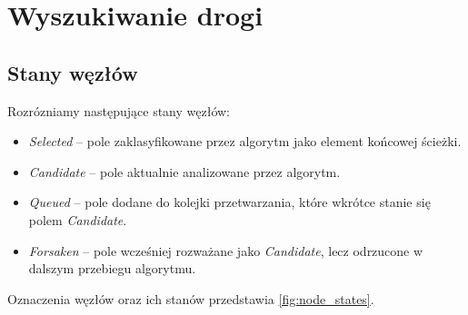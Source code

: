 \documentclass[../../doc.tex]{subfiles}
\begin{document}
\section{Wyszukiwanie drogi}


\subsection{Stany węzłów}

\label{sec:node_states}

Rozrózniamy następujące stany węzłów:

\begin{itemize}
  \item \textit{Selected} -- pole zaklasyfikowane przez algorytm jako element końcowej ścieżki.
  \item \textit{Candidate} -- pole aktualnie analizowane przez algorytm.
  \item \textit{Queued} -- pole dodane do kolejki przetwarzania, które wkrótce stanie się polem \textit{Candidate}.
  \item \textit{Forsaken} -- pole wcześniej rozważane jako \textit{Candidate}, lecz odrzucone w dalszym przebiegu algorytmu.
\end{itemize}


Oznaczenia węzłów oraz ich stanów przedstawia \cref{fig:node_states}.
\end{document}
